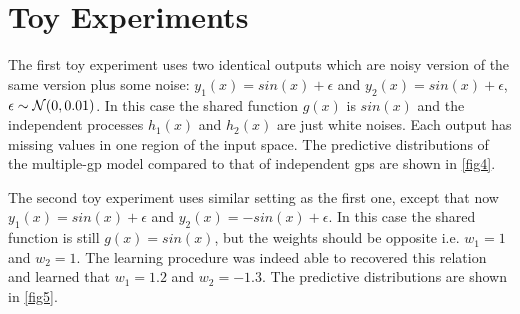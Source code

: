 \section{Toy Experiments}
The first toy experiment uses two identical outputs which are noisy version of the same version plus some noise: $y_1(x) = sin(x) + \epsilon$ and $y_2(x) = sin(x) + \epsilon$, $\epsilon \sim \mathcal{N}(0,0.01)$.
In this case the shared function $g(x)$ is $sin(x)$ and the independent processes $h_1(x)$ and $h_2(x)$ are just white noises.
Each output has missing values in one region of the input space.
The predictive distributions of the multiple-gp model compared to that of independent gps are shown in \ref{fig4}.

\noindent The second toy experiment uses similar setting as the first one, except that now $y_1(x) = sin(x) + \epsilon$ and $y_2(x) = -sin(x) + \epsilon$. 
In this case the shared function is still $g(x) = sin(x)$, but the weights should be opposite i.e. $w_1 = 1$ and $w_2 = 1$.
The learning procedure was indeed able to recovered this relation and learned that $w_1 = 1.2$ and $w_2 = -1.3$.
The predictive distributions are shown in \ref{fig5}.

